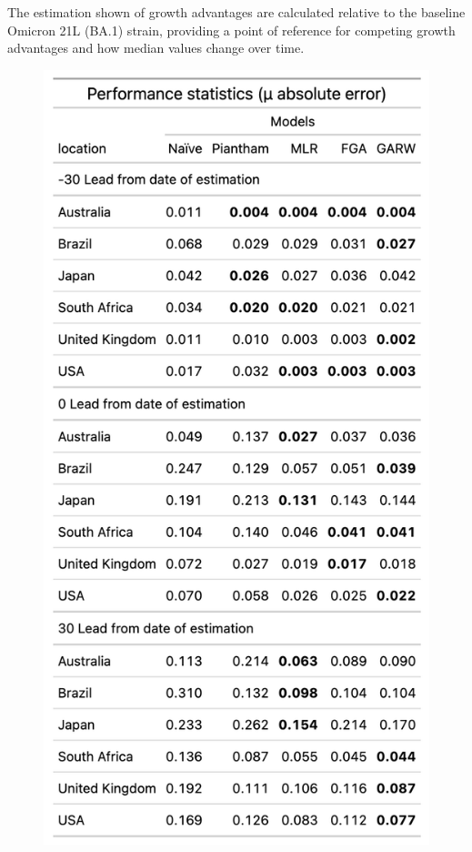 \documentclass[11pt,oneside,letterpaper]{article}
\begin{document}
The estimation shown of growth advantages are calculated relative to the baseline Omicron 21L (BA.1) strain, providing a point of reference for competing growth advantages and how median values change over time. 







% 




%



\begin{figure}[h]
	\centering
	\includegraphics[width=1.0\textwidth]{figures/table1.png}

\end{figure}
\end{document}
